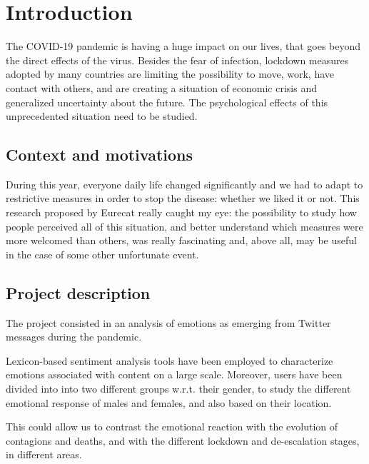 \chapter{Introduction}
\label{cha:intro}

The COVID-19 pandemic is having a huge impact on our lives, that goes beyond the direct effects of the virus. Besides the fear of infection, lockdown measures adopted by many countries are limiting the possibility to move, work, have contact with others, and are creating a situation of economic crisis and generalized uncertainty about the future. The psychological effects of this unprecedented situation need to be studied.


\section{Context and motivations}
\label{sec:context}

During this year, everyone daily life changed significantly and we had to adapt to restrictive measures in order to stop the disease: whether we liked it or not. This research proposed by Eurecat really caught my eye: the possibility to study how people perceived all of this situation, and better understand which measures were more welcomed than others, was really fascinating and, above all, may be useful in the case of some other unfortunate event.

\section{Project description}
\label{sec:project}

The project consisted in an analysis of emotions as emerging from Twitter messages during the pandemic.

Lexicon-based sentiment analysis tools have been employed to characterize emotions associated with content on a large scale. Moreover, users have been divided into into two different groups w.r.t. their gender, to study the different emotional response of males and females, and also based on their location. 

This could allow us to contrast the emotional reaction with the evolution of contagions and deaths, and with the different lockdown and de-escalation stages, in different areas.

